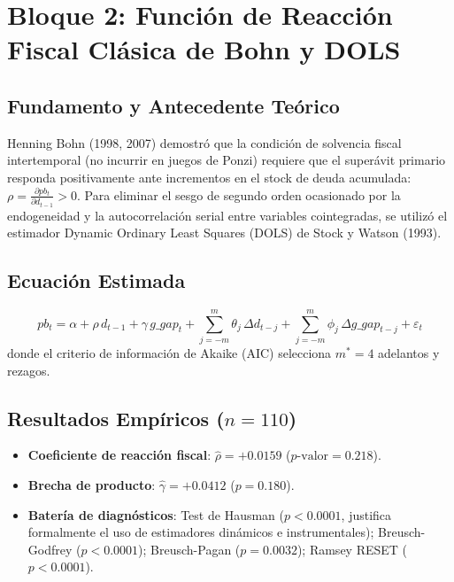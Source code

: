 \documentclass[11pt,a4paper]{article}
\begin{document}
\vspace{1em}

\section{Bloque 2: Función de Reacción Fiscal Clásica de Bohn y DOLS}

\subsection{Fundamento y Antecedente Teórico}
Henning Bohn (1998, 2007) demostró que la condición de solvencia fiscal intertemporal (no incurrir en juegos de Ponzi) requiere que el superávit primario responda positivamente ante incrementos en el stock de deuda acumulada: $\rho = \frac{\partial pb_t}{\partial d_{t-1}} > 0$. Para eliminar el sesgo de segundo orden ocasionado por la endogeneidad y la autocorrelación serial entre variables cointegradas, se utilizó el estimador Dynamic Ordinary Least Squares (DOLS) de Stock y Watson (1993).

\subsection{Ecuación Estimada}
\begin{equation}
pb_t = \alpha + \rho \, d_{t-1} + \gamma \, g\_gap_t + \sum_{j=-m}^m \theta_j \, \Delta d_{t-j} + \sum_{j=-m}^m \phi_j \, \Delta g\_gap_{t-j} + \varepsilon_t
\end{equation}
donde el criterio de información de Akaike (AIC) selecciona $m^* = 4$ adelantos y rezagos.

\subsection{Resultados Empíricos ($n=110$)}
\begin{itemize}[leftmargin=1.5em]
    \item \textbf{Coeficiente de reacción fiscal}: $\hat{\rho} = \mathbf{+0.0159}$ ($p\text{-valor} = 0.218$).
    \item \textbf{Brecha de producto}: $\hat{\gamma} = +0.0412$ ($p = 0.180$).
    \item \textbf{Batería de diagnósticos}: Test de Hausman ($p < 0.0001$, justifica formalmente el uso de estimadores dinámicos e instrumentales); Breusch-Godfrey ($p < 0.0001$); Breusch-Pagan ($p = 0.0032$); Ramsey RESET ($p < 0.0001$).
\end{itemize}
\end{document}
